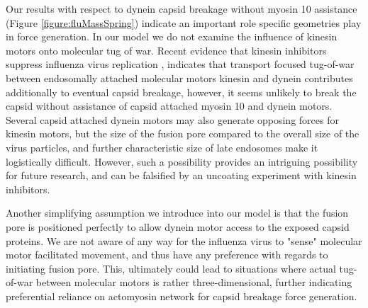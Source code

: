 Our results with respect to dynein capsid breakage without myosin 10 assistance (Figure \ref{figure:fluMassSpring}) indicate an important role specific geometries play in force generation. In our model we do not examine the influence of kinesin motors onto molecular tug of war. Recent evidence that kinesin inhibitors suppress influenza virus replication \cite{cho2020selective, kim2021kif11}, indicates that transport focused tug-of-war between endosomally attached molecular motors kinesin and dynein contributes additionally to eventual capsid breakage, however, it seems unlikely to break the capsid  without assistance of capsid attached myosin 10 and dynein motors. Several capsid attached dynein motors may also generate opposing forces for kinesin motors, but the size of the fusion pore compared to the overall size of the virus particles, and further characteristic size of late endosomes make it logistically difficult. However, such a possibility provides an intriguing possibility for future research, and can be falsified by an uncoating experiment with kinesin inhibitors.

Another simplifying assumption we introduce into our model is that the fusion pore is positioned perfectly to allow dynein motor access to the exposed capsid proteins. We are not aware of any way for the influenza virus to "sense" molecular motor facilitated movement, and thus have any preference with regards to initiating fusion pore. This, ultimately could lead to situations where actual tug-of-war between molecular motors is rather three-dimensional, further indicating preferential reliance on actomyosin network for capsid breakage force generation.